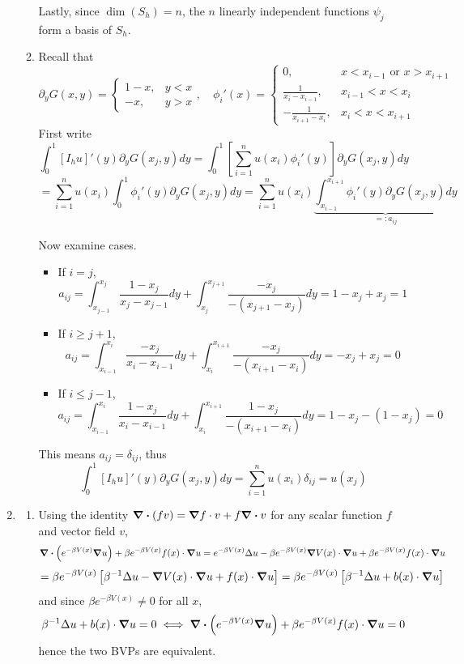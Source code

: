 \documentclass{article}
\newcommand{\sbr}[1]{\left[#1\right]}
\newcommand{\inv}{^{-1}}
\newcommand{\ptl}{\partial}
\begin{document}
\begin{enumerate}
\begin{enumerate}
	Lastly, since $\dim(S_h)=n$, the $n$ linearly independent functions $\psi_j$ form a basis of $S_h$.
	
	
	\item Recall that
	$$\ptl_yG(x,y) =
	\begin{cases}
		1-x, & y<x\\
		-x, & y>x
	\end{cases},
	\quad \phi_i'(x) =
	\begin{cases}
		0, & x<x_{i-1} \text{ or } x>x_{i+1}\\
		\frac{1}{x_i-x_{i-1}}, & x_{i-1}<x<x_i\\
		-\frac{1}{x_{i+1}-x_i}, & x_i<x<x_{i+1}
	\end{cases}$$
	First write
	$$\int_0^1 [I_hu]'(y)\ptl_yG(x_j,y)dy
	= \int_0^1 \sbr{\sum_{i=1}^n u(x_i)\phi_i'(y)}\ptl_yG(x_j,y)dy$$
	$$= \sum_{i=1}^n u(x_i)\int_0^1 \phi_i'(y)\ptl_yG(x_j,y)dy
	= \sum_{i=1}^n u(x_i)\underbrace{\int_{x_{i-1}}^{x_{i+1}} \phi_i'(y)\ptl_yG(x_j,y)dy}_{=:a_{ij}}$$
	
	Now examine cases.
	\begin{itemize}
		
		\item If $i=j$,
		$$a_{ij} = \int_{x_{j-1}}^{x_j}\frac{1-x_j}{x_j-x_{j-1}}dy + \int_{x_j}^{x_{j+1}}\frac{-x_j}{-(x_{j+1}-x_j)}dy
		= 1 - x_j + x_j
		= 1$$
		
		\item If $i\ge j+1$,
		$$a_{ij} = \int_{x_{i-1}}^{x_i}\frac{-x_j}{x_i-x_{i-1}}dy + \int_{x_i}^{x_{i+1}}\frac{-x_j}{-(x_{i+1}-x_i)}dy
		= -x_j + x_j
		= 0$$
		
		\item If $i\le j-1$,
		$$a_{ij} = \int_{x_{i-1}}^{x_i}\frac{1-x_j}{x_i-x_{i-1}}dy + \int_{x_i}^{x_{i+1}}\frac{1-x_j}{-(x_{i+1}-x_i)}dy
		= 1 - x_j - (1 - x_j)
		= 0$$	
		
	\end{itemize}
	This means $a_{ij}=\delta_{ij}$, thus
	$$\int_0^1 [I_hu]'(y)\ptl_yG(x_j,y)dy = \sum_{i=1}^n u(x_i)\delta_{ij} = u(x_j)$$

\end{enumerate}



\item

\begin{enumerate}
	
	\item Using the identity $\div(fv)=\grad f\cdot v+f\div v$ for any scalar function $f$ and vector field $v$,
	$$\div(e^{-\beta V(x)}\grad u) + \beta e^{-\beta V(x)}f(x)\cdot\grad u
	= e^{-\beta V(x)}\Delta u - \beta e^{-\beta V(x)}\grad V(x)\cdot\grad u + \beta e^{-\beta V(x)}f(x)\cdot\grad u$$
	$$= \beta e^{-\beta V(x)}\sbr{\beta\inv\Delta u - \grad V(x)\cdot\grad u + f(x)\cdot\grad u}
	= \beta e^{-\beta V(x)}\sbr{\beta\inv\Delta u + b(x)\cdot\grad u}$$
	and since $\beta e^{-\beta V(x)}\ne0$ for all $x$,
	$$\beta\inv\Delta u + b(x)\cdot\grad u = 0
	\iff \div(e^{-\beta V(x)}\grad u) + \beta e^{-\beta V(x)}f(x)\cdot\grad u = 0$$
	hence the two BVPs are equivalent.
	

\end{enumerate}
\end{enumerate}
\end{document}
